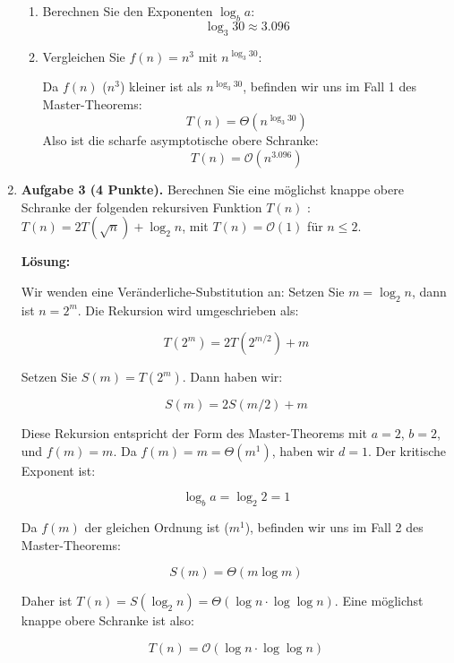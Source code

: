 \documentclass[11pt]{article}
\begin{document}
\begin{enumerate}
	      \begin{enumerate}
		      \item Berechnen Sie den Exponenten \(\log_b a\):
		            \[
			            \log_3 30 \approx 3.096
		            \]
		      \item Vergleichen Sie \(f(n) = n^3\) mit \(n^{\log_3 30}\):

		            Da \(f(n)\) (\(n^3\)) kleiner ist als \(n^{\log_3 30}\), befinden wir uns im Fall 1 des Master-Theorems:
		            \[
			            T(n) = \Theta\left(n^{\log_3 30}\right)
		            \]
		            Also ist die scharfe asymptotische obere Schranke:
		            \[
			            T(n) = \mathcal{O}\left(n^{3.096}\right)
		            \]
	      \end{enumerate}

	\item
	      \textbf{Aufgabe 3 (4 Punkte).} Berechnen Sie eine möglichst knappe obere Schranke der folgenden rekursiven Funktion \(T(n)\) : \(T(n)=2 T(\sqrt{n})+\log_2 n\), mit \(T(n)=\mathcal{O}(1)\) für \(n \leq 2\).

	      \textbf{Lösung:}

	      Wir wenden eine Veränderliche-Substitution an: Setzen Sie \(m = \log_2 n\), dann ist \(n = 2^m\). Die Rekursion wird umgeschrieben als:

	      \[
		      T(2^m) = 2 T(2^{m/2}) + m
	      \]

	      Setzen Sie \(S(m) = T(2^m)\). Dann haben wir:

	      \[
		      S(m) = 2 S(m/2) + m
	      \]

	      Diese Rekursion entspricht der Form des Master-Theorems mit \(a = 2\), \(b = 2\), und \(f(m) = m\). Da \(f(m) = m = \Theta(m^1)\), haben wir \(d = 1\). Der kritische Exponent ist:

	      \[
		      \log_b a = \log_2 2 = 1
	      \]

	      Da \(f(m)\) der gleichen Ordnung ist (\(m^1\)), befinden wir uns im Fall 2 des Master-Theorems:

	      \[
		      S(m) = \Theta(m \log m)
	      \]

	      Daher ist \(T(n) = S(\log_2 n) = \Theta(\log n \cdot \log \log n)\). Eine möglichst knappe obere Schranke ist also:

	      \[
		      T(n) = \mathcal{O}(\log n \cdot \log \log n)
	      \]

\end{enumerate}
\end{document}
